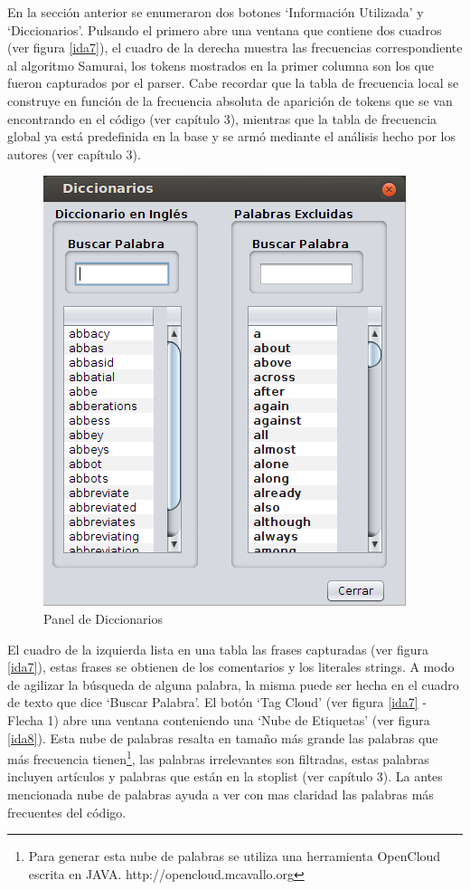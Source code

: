 \documentclass[a4paper,12pt]{report}
\begin{document}
En la sección anterior se enumeraron dos botones `Información Utilizada' y `Diccionarios'. Pulsando el primero abre una ventana que contiene dos cuadros (ver figura \ref{ida7}), el cuadro de la derecha muestra las frecuencias correspondiente al algoritmo Samurai, los tokens mostrados en la primer columna son los que fueron capturados por el parser. Cabe recordar que la tabla de frecuencia local se construye en función de la frecuencia absoluta de aparición de tokens que se van encontrando en el código (ver capítulo 3), mientras que la tabla de frecuencia global ya está predefinida en la base y se armó mediante el análisis hecho por los autores (ver capítulo 3).

\begin{figure}[t] %
\centerline{%
\includegraphics[scale= 0.6]{./ida_09.png}
}
\caption{Panel de Diccionarios}
\label{ida9}
\end{figure}

El cuadro de la izquierda lista en una tabla las frases capturadas (ver figura \ref{ida7}), estas frases se obtienen de los comentarios y los literales strings. A modo de agilizar la búsqueda de alguna palabra, la misma puede ser hecha en el cuadro de texto que dice `Buscar Palabra'. El botón `Tag Cloud' (ver figura \ref{ida7} - Flecha 1) abre una ventana conteniendo una `Nube de Etiquetas' (ver figura \ref{ida8}). Esta nube de palabras resalta en tamaño más grande las palabras que más frecuencia tienen\footnote[1]{Para generar esta nube de palabras se utiliza una herramienta OpenCloud escrita en JAVA. http://opencloud.mcavallo.org}, las palabras irrelevantes son filtradas, estas palabras incluyen artículos y palabras que están en la stoplist (ver capítulo 3). La antes mencionada nube de palabras ayuda a ver con mas claridad las palabras más frecuentes del código.
\end{document}
